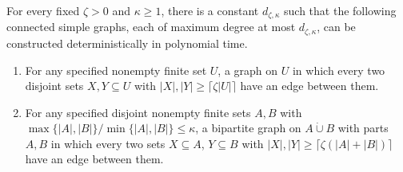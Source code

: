 \begin{lemma}
\label{lem:factor-expanders}
For every fixed $\zeta>0$ and $\kappa\ge1$, there is a constant
$d_{\zeta,\kappa}$ such that the following connected simple graphs,
each of maximum degree at most $d_{\zeta,\kappa}$, can be constructed
deterministically in polynomial time.
\begin{enumerate}
 \item For any specified nonempty finite set $U$, a graph on $U$
 in which every two disjoint sets $X,Y\subseteq U$ with
 $|X|,|Y|\ge\lceil\zeta|U|\rceil$ have an edge between them.
 \item For any specified disjoint nonempty finite sets $A,B$ with
 $\max\{|A|,|B|\}/\min\{|A|,|B|\}\le\kappa$, a bipartite graph
 on $A\mathbin{\dot\cup}B$ with parts $A,B$ in which every two sets
 $X\subseteq A$, $Y\subseteq B$ with
 $|X|,|Y|\ge\lceil\zeta(|A|+|B|)\rceil$ have an edge between them.
\end{enumerate}
\end{lemma}




